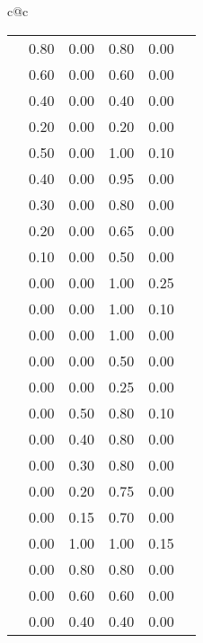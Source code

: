 \begin{table}[!ht]
\begin{center}
\begin{scriptsize}
\begin{tabular}{c@{\quad}c}
\begin{tabular}{|c|c|cccc|}
      \clrow{darkgreen}                & 0.80 & 0.00 & 0.80 & 0.00 \\
      \clrow{green}                    & 0.60 & 0.00 & 0.60 & 0.00 \\
      \clrow{lightgreen}               & 0.40 & 0.00 & 0.40 & 0.00 \\
      \clrow{verylightgreen}           & 0.20 & 0.00 & 0.20 & 0.00 \\
      \clspc
      \clrow{verydarklimegreen}        & 0.50 & 0.00 & 1.00 & 0.10 \\
      \clrow{darklimegreen}            & 0.40 & 0.00 & 0.95 & 0.00 \\
      \clrow{limegreen}                & 0.30 & 0.00 & 0.80 & 0.00 \\
      \clrow{lightlimegreen}           & 0.20 & 0.00 & 0.65 & 0.00 \\
      \clrow{verylightlimegreen}       & 0.10 & 0.00 & 0.50 & 0.00 \\
      \clspc
      \clrow{verydarkyellow}           & 0.00 & 0.00 & 1.00 & 0.25 \\
      \clrow{darkyellow}               & 0.00 & 0.00 & 1.00 & 0.10 \\
      \clrow{yellow}                   & 0.00 & 0.00 & 1.00 & 0.00 \\
      \clrow{lightyellow}              & 0.00 & 0.00 & 0.50 & 0.00 \\
      \clrow{verylightyellow}          & 0.00 & 0.00 & 0.25 & 0.00 \\
      \clspc
      \clrow{verydarkorange}           & 0.00 & 0.50 & 0.80 & 0.10 \\
      \clrow{darkorange}               & 0.00 & 0.40 & 0.80 & 0.00 \\
      \clrow{orange}                   & 0.00 & 0.30 & 0.80 & 0.00 \\
      \clrow{lightorange}              & 0.00 & 0.20 & 0.75 & 0.00 \\
      \clrow{verylightorange}          & 0.00 & 0.15 & 0.70 & 0.00 \\
      \clspc
      \clrow{verydarkred}              & 0.00 & 1.00 & 1.00 & 0.15 \\
      \clrow{darkred}                  & 0.00 & 0.80 & 0.80 & 0.00 \\
      \clrow{red}                      & 0.00 & 0.60 & 0.60 & 0.00 \\
      \clrow{lightred}                 & 0.00 & 0.40 & 0.40 & 0.00 \\

\end{tabular}
\end{tabular}
\end{scriptsize}
\end{center}
\end{table}
